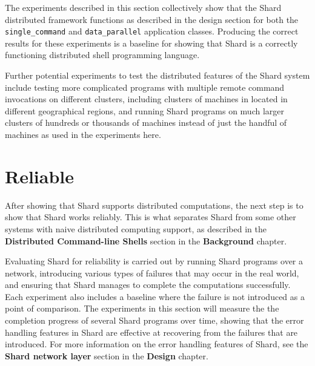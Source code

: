 \documentclass[twoside]{report}
\begin{document}
The experiments described in this section collectively show that the Shard distributed framework functions as described in the design section for both the \texttt{single\_command} and \texttt{data\_parallel} application classes.
Producing the correct results for these experiments is a baseline for showing that Shard is a correctly functioning distributed shell programming language.

Further potential experiments to test the distributed features of the Shard system include testing more complicated programs with multiple remote command invocations on different clusters, including clusters of machines in located in different geographical regions, and running Shard programs on much larger clusters of hundreds or thousands of machines instead of just the handful of machines as used in the experiments here.

\section{Reliable}


After showing that Shard supports distributed computations, the next step is to show that Shard works reliably.
This is what separates Shard from some other systems with naive distributed computing support, as described in the \textbf{Distributed Command-line Shells} section in the \textbf{Background} chapter.

Evaluating Shard for reliability is carried out by running Shard programs over a network, introducing various types of failures that may occur in the real world, and ensuring that Shard manages to complete the computations successfully.
Each experiment also includes a baseline where the failure is not introduced as a point of comparison.
The experiments in this section will measure the the completion progress of several Shard programs over time, showing that the error handling features in Shard are effective at recovering from the failures that are introduced.
For more information on the error handling features of Shard, see the \textbf{Shard network layer} section in the \textbf{Design} chapter.
\end{document}
